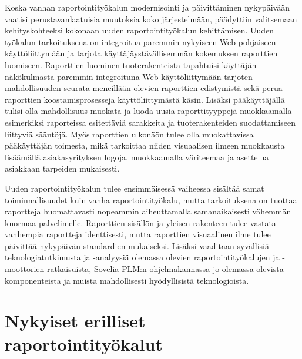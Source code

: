 Koska vanhan raportointityökalun modernisointi ja päivittäminen nykypäivään vaatisi perustavanlaatuisia muutoksia koko järjestelmään, päädyttiin valitsemaan kehityskohteeksi kokonaan uuden raportointityökalun kehittämisen. Uuden työkalun tarkoituksena on integroitua paremmin nykyiseen Web-pohjaiseen käyttöliittymään ja tarjota käyttäjäystävällisemmän kokemuksen raporttien luomiseen. Raporttien luominen tuoterakenteista tapahtuisi käyttäjän näkökulmasta paremmin integroituna Web-käyttöliittymään tarjoten mahdollisuuden seurata meneillään olevien raporttien edistymistä sekä perua raporttien koostamisprosesseja käyttöliittymästä käsin. Lisäksi pääkäyttäjällä tulisi olla mahdollisuus muokata ja luoda uusia raporttityyppejä muokkaamalla esimerkiksi raporteissa esitettäviä sarakkeita ja tuoterakenteiden suodattamiseen liittyviä sääntöjä. Myös raporttien ulkonäön tulee olla muokattavissa pääkäyttäjän toimesta, mikä tarkoittaa niiden visuaalisen ilmeen muokkausta lisäämällä asiakasyrityksen logoja, muokkaamalla väriteemaa ja asettelua asiakkaan tarpeiden mukaisesti.

Uuden raportointityökalun tulee ensimmäisessä vaiheessa sisältää samat toiminnallisuudet kuin vanha raportointityökalu, mutta tarkoituksena on tuottaa raportteja huomattavasti nopeammin aiheuttamalla samanaikaisesti vähemmän kuormaa palvelimelle. Raporttien sisällön ja yleisen rakenteen tulee vastata vanhempia raportteja identtisesti, mutta raporttien visuaalinen ilme tulee päivittää nykypäivän standardien mukaiseksi. Lisäksi vaaditaan syvällisiä teknologiatutkimusta ja -analyysiä olemassa olevien raportointityökalujen ja -moottorien ratkaisuista, Sovelia PLM:n ohjelmakannassa jo olemassa olevista komponenteista ja muista mahdollisesti hyödyllisistä teknologioista.

\section{Nykyiset erilliset raportointityökalut}

